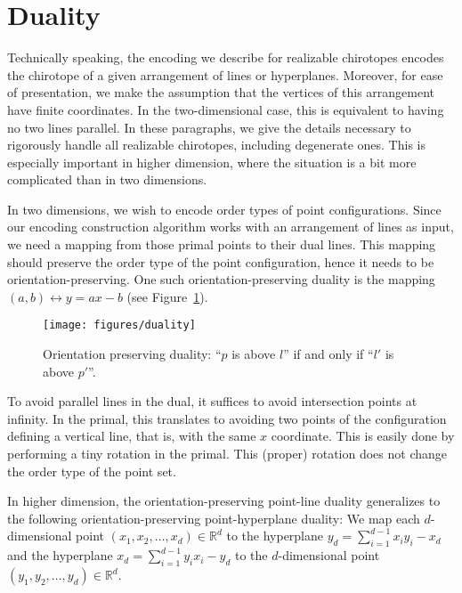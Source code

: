 \section{Duality}%
\label{sec:point-configurations:duality}

Technically speaking, the encoding we describe for realizable chirotopes
encodes the chirotope of a given arrangement of lines or hyperplanes.
Moreover, for ease of presentation, we make the assumption that the vertices of
this arrangement have finite coordinates. In the two-dimensional case, this
is equivalent to having no two lines parallel. In these paragraphs, we give the
details necessary to rigorously handle all realizable chirotopes, including
degenerate ones. This is especially important in higher dimension, where the
situation is a bit more complicated than in two dimensions.

In two dimensions, we wish to encode order types of point configurations.
Since our encoding construction algorithm works with an arrangement of lines as
input, we need a mapping from those primal points to their dual lines. This
mapping should preserve the order type of the point configuration, hence it
needs to be orientation-preserving. One such orientation-preserving duality is
the mapping \((a,b) \leftrightarrow y = ax - b\) (see Figure~\ref{fig:duality}).

\begin{figure}
  \centering{}
  \texttt{[image: figures/duality]}
  \caption{Orientation preserving duality: ``\(p\) is above \(l\)'' if and only if
  ``\(l'\) is above \(p'\)''.}\label{fig:duality}
\end{figure}

To avoid parallel lines in the dual, it suffices to avoid intersection points
at infinity. In the primal, this translates to avoiding two points of the
configuration defining a vertical line, that is, with the same \(x\) coordinate.
This is easily done by performing a tiny rotation in the primal.
This (proper) rotation does not change the order type of the point set.

In higher dimension, the orientation-preserving point-line duality generalizes
to the following orientation-preserving point-hyperplane duality: We map each
\(d\)-dimensional point \((x_1, x_2, \ldots, x_d) \in \mathbb{R}^d\) to the hyperplane \(y_d =
\sum_{i=1}^{d-1} x_i y_i - x_d \) and the hyperplane \(x_d = \sum_{i=1}^{d-1}
y_i x_i - y_d \) to the \(d\)-dimensional point \(( y_1, y_2, \ldots, y_d) \in
\mathbb{R}^d\).

